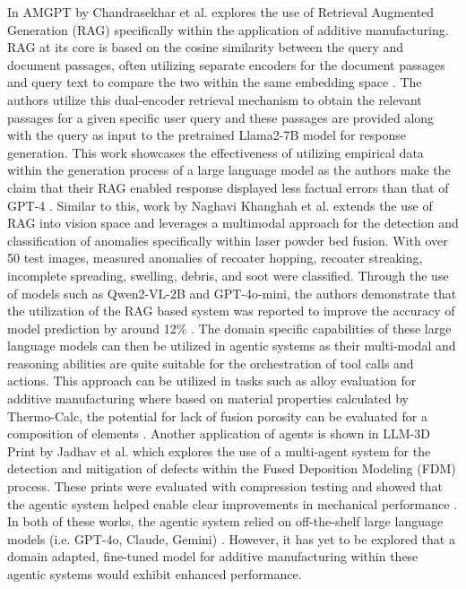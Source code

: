 In AMGPT by Chandrasekhar et al. \cite{chandrasekhar_amgpt_2024} explores the
use of Retrieval Augmented Generation (RAG)
\cite{lewis_retrieval-augmented_2020} specifically within the application of
additive manufacturing. RAG at its core is based on the cosine similarity
between the query and document passages, often utilizing separate encoders for
the document passages and query text to compare the two within the same
embedding space \cite{lewis_retrieval-augmented_2020}. The authors utilize this
dual-encoder retrieval mechanism to obtain the relevant passages for a given
specific user query and these passages are provided along with the query as
input to the pretrained Llama2-7B \cite{touvron_llama_2023} model for response
generation. This work showcases the effectiveness of utilizing empirical data
within the generation process of a large language model as the authors make the
claim that their RAG enabled response displayed less factual errors than that of
GPT-4 \cite{chandrasekhar_amgpt_2024}. Similar to this, work by Naghavi Khanghah
et al. \cite{naghavi_khanghah_multimodal_2025} extends the use of RAG into
vision space and leverages a multimodal approach for the detection and
classification of anomalies specifically within laser powder bed fusion. With
over 50 test images, measured anomalies of recoater hopping, recoater streaking,
incomplete spreading, swelling, debris, and soot were classified. Through the
use of models such as Qwen2-VL-2B and GPT-4o-mini, the authors demonstrate that
the utilization of the RAG based system was reported to improve the accuracy of
model prediction by around 12\% \cite{naghavi_khanghah_multimodal_2025}. The
domain specific capabilities of these large language models can then be utilized
in agentic systems as their multi-modal and reasoning abilities are quite
suitable for the orchestration of tool calls and actions. This approach can be
utilized in tasks such as alloy evaluation for additive manufacturing where
based on material properties calculated by Thermo-Calc, the potential for lack
of fusion porosity can be evaluated for a composition of elements
\cite{pak_agentic_2026}. Another application of agents is shown in LLM-3D Print
by Jadhav et al. \cite{jadhav_llm-3d_2025} which explores the use of a
multi-agent system for the detection and mitigation of defects within the Fused
Deposition Modeling (FDM) process. These prints were evaluated with compression
testing and showed that the agentic system helped enable clear improvements in
mechanical performance \cite{jadhav_llm-3d_2025}. In both of these works, the
agentic system relied on off-the-shelf large language models (i.e. GPT-4o,
Claude, Gemini) \cite{jadhav_llm-3d_2025, pak_agentic_2026}. However, it has yet
to be explored that a domain adapted, fine-tuned model for additive
manufacturing within these agentic systems would exhibit enhanced performance.


